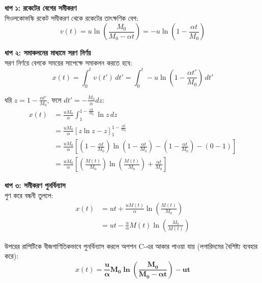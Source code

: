 \documentclass[12pt, a4paper]{article}
\begin{document}
\begin{tcolorbox}[solutionbox={সমাধান (Solution)}]
    \noindent
    \textbf{ধাপ ১: রকেটের বেগের সমীকরণ} \\
    সিওলকোভস্কি রকেট সমীকরণ থেকে রকেটের তাৎক্ষণিক বেগ:
    \[ v(t) = u \ln\left(\frac{M_0}{M_0 - \alpha t}\right) = -u \ln\left(1 - \frac{\alpha t}{M_0}\right) \]
    
    \vspace{0.5em}
    \noindent\textbf{ধাপ ২: সমাকলনের মাধ্যমে সরণ নির্ণয়} \\
    সরণ নির্ণয়ে বেগকে সময়ের সাপেক্ষে সমাকলন করতে হবে:
    \[ x(t) = \int_0^t v(t') \, dt' = \int_0^t -u \ln\left(1 - \frac{\alpha t'}{M_0}\right) \, dt' \]
    
    ধরি $z = 1 - \frac{\alpha t'}{M_0}$, ফলে $dt' = -\frac{M_0}{\alpha} dz$:
    \begin{align*}
        x(t) &= \frac{u M_0}{\alpha} \int_{1}^{1 - \frac{\alpha t}{M_0}} \ln z \, dz \\
             &= \frac{u M_0}{\alpha} \left[ z \ln z - z \right]_{1}^{1 - \frac{\alpha t}{M_0}} \\
             &= \frac{u M_0}{\alpha} \left[ \left(1 - \frac{\alpha t}{M_0}\right) \ln\left(1 - \frac{\alpha t}{M_0}\right) - \left(1 - \frac{\alpha t}{M_0}\right) - (0 - 1) \right] \\
             &= \frac{u M_0}{\alpha} \left[ \left(\frac{M(t)}{M_0}\right) \ln\left(\frac{M(t)}{M_0}\right) + \frac{\alpha t}{M_0} \right]
    \end{align*}
    
    \vspace{0.5em}
    \noindent\textbf{ধাপ ৩: সমীকরণ পুনর্বিন্যাস} \\
    গুণ করে বন্ধনী তুললে:
    \begin{align*}
        x(t) &= u t + \frac{u M(t)}{\alpha} \ln\left(\frac{M(t)}{M_0}\right) \\
             &= u t - \frac{u}{\alpha} M(t) \ln\left(\frac{M_0}{M(t)}\right)
    \end{align*}
    
    উপরের রাশিটিকে বীজগাণিতিকভাবে পুনর্বিন্যাস করলে অপশন C-এর আকার পাওয়া যায় (লগারিদমের বৈশিষ্ট্য ব্যবহার করে):
    \[ x(t) = \mathbf{\frac{u}{\alpha} M_0 \ln\left(\frac{M_0}{M_0 - \alpha t}\right) - u t} \]
\end{tcolorbox}
\end{document}
